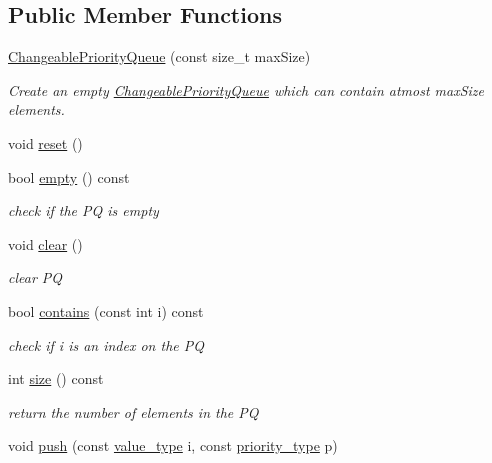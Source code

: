 \subsection*{Public Member Functions}
\begin{DoxyCompactItemize}
\item 
\hyperlink{classnifty_1_1tools_1_1ChangeablePriorityQueue_a5882abdd882fadd12ba20fd181b80c00}{Changeable\+Priority\+Queue} (const size\+\_\+t max\+Size)
\begin{DoxyCompactList}\small\item\em Create an empty \hyperlink{classnifty_1_1tools_1_1ChangeablePriorityQueue}{Changeable\+Priority\+Queue} which can contain atmost max\+Size elements. \end{DoxyCompactList}\item 
void \hyperlink{classnifty_1_1tools_1_1ChangeablePriorityQueue_a544ad33d36c8c3884951b048c9fae0d7}{reset} ()
\item 
bool \hyperlink{classnifty_1_1tools_1_1ChangeablePriorityQueue_a72b99349411452bef664191455f31b30}{empty} () const
\begin{DoxyCompactList}\small\item\em check if the PQ is empty \end{DoxyCompactList}\item 
void \hyperlink{classnifty_1_1tools_1_1ChangeablePriorityQueue_ab919dd067f7435c0e10268d81f474179}{clear} ()
\begin{DoxyCompactList}\small\item\em clear PQ \end{DoxyCompactList}\item 
bool \hyperlink{classnifty_1_1tools_1_1ChangeablePriorityQueue_ac6aa1d06e1cb5c2b13bfa58594e01ec6}{contains} (const int i) const
\begin{DoxyCompactList}\small\item\em check if i is an index on the PQ \end{DoxyCompactList}\item 
int \hyperlink{classnifty_1_1tools_1_1ChangeablePriorityQueue_adbb917b18a8bec3c379dfa742a9aacfd}{size} () const
\begin{DoxyCompactList}\small\item\em return the number of elements in the PQ \end{DoxyCompactList}\item 
void \hyperlink{classnifty_1_1tools_1_1ChangeablePriorityQueue_ada41a7adfde46118d48833321ac94066}{push} (const \hyperlink{classnifty_1_1tools_1_1ChangeablePriorityQueue_aa00fbc748b94bdc6175b4c49bb2bba48}{value\+\_\+type} i, const \hyperlink{classnifty_1_1tools_1_1ChangeablePriorityQueue_a6ecafb387f99a1cfa7ff5795c924682c}{priority\+\_\+type} p)

\end{DoxyCompactItemize}
